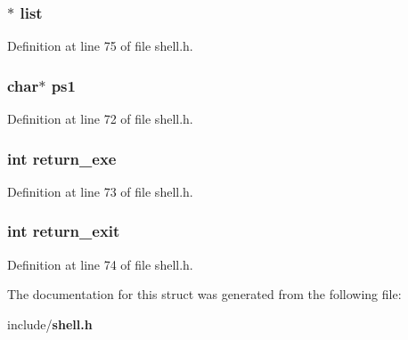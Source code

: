 \subsubsection[{list}]{$\ast$ list}\label{structs__data_a1f8c1ae59fa5c273cd528969d4ba8dd7}


Definition at line 75 of file shell.\-h.

\subsubsection[{ps1}]{\setlength{\rightskip}{0pt plus 5cm}char$\ast$ ps1}\label{structs__data_acfb34a195b82ba94df86b2ff75a18647}


Definition at line 72 of file shell.\-h.

\subsubsection[{return\-\_\-exe}]{\setlength{\rightskip}{0pt plus 5cm}int return\-\_\-exe}\label{structs__data_a57883f7329f18bee1eae1d5589bdd2ec}


Definition at line 73 of file shell.\-h.

\subsubsection[{return\-\_\-exit}]{\setlength{\rightskip}{0pt plus 5cm}int return\-\_\-exit}\label{structs__data_ac031cf6c1b18f3f224e088dd3a13b680}


Definition at line 74 of file shell.\-h.



The documentation for this struct was generated from the following file\-:\begin{DoxyCompactItemize}
\item 
include/{\bf shell.\-h}\end{DoxyCompactItemize}
